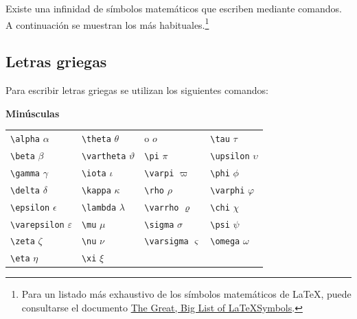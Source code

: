 \documentclass[
  a4paper,
]{scrreport}
\theoremstyle{definition}
\theoremstyle{remark}
\begin{document}
Existe una infinidad de símbolos matemáticos que escriben mediante
comandos. A continuación se muestran los más habituales.\footnote{Para
  un listado más exhaustivo de los símbolos matemáticos de \LaTeX, puede
  consultarse el documento
  \href{https://www3.nd.edu/~nmark/UsefulFacts/LaTeX_symbols.pdf}{The
  Great, Big List of \LaTeX Symbols}.}

\subsection{Letras griegas}\label{letras-griegas}

Para escribir letras griegas se utilizan los siguientes comandos:

\textbf{Minúsculas}

\begin{longtable}[]{@{}
  >{\raggedright\arraybackslash}p{}
  >{\raggedright\arraybackslash}p{}
  >{\raggedright\arraybackslash}p{}
  >{\raggedright\arraybackslash}p{}@{}}
\toprule\noalign{}
\endhead
\bottomrule\noalign{}
\endlastfoot
\texttt{\textbackslash{}alpha} \(\alpha\) &
\texttt{\textbackslash{}theta} \(\theta\) & o \(o\) &
\texttt{\textbackslash{}tau} \(\tau\) \\
\texttt{\textbackslash{}beta} \(\beta\) &
\texttt{\textbackslash{}vartheta} \(\vartheta\) &
\texttt{\textbackslash{}pi} \(\pi\) & \texttt{\textbackslash{}upsilon}
\(\upsilon\) \\
\texttt{\textbackslash{}gamma} \(\gamma\) &
\texttt{\textbackslash{}iota} \(\iota\) & \texttt{\textbackslash{}varpi}
\(\varpi\) & \texttt{\textbackslash{}phi} \(\phi\) \\
\texttt{\textbackslash{}delta} \(\delta\) &
\texttt{\textbackslash{}kappa} \(\kappa\) & \texttt{\textbackslash{}rho}
\(\rho\) & \texttt{\textbackslash{}varphi} \(\varphi\) \\
\texttt{\textbackslash{}epsilon} \(\epsilon\) &
\texttt{\textbackslash{}lambda} \(\lambda\) &
\texttt{\textbackslash{}varrho} \(\varrho\) &
\texttt{\textbackslash{}chi} \(\chi\) \\
\texttt{\textbackslash{}varepsilon} \(\varepsilon\) &
\texttt{\textbackslash{}mu} \(\mu\) & \texttt{\textbackslash{}sigma}
\(\sigma\) & \texttt{\textbackslash{}psi} \(\psi\) \\
\texttt{\textbackslash{}zeta} \(\zeta\) & \texttt{\textbackslash{}nu}
\(\nu\) & \texttt{\textbackslash{}varsigma} \(\varsigma\) &
\texttt{\textbackslash{}omega} \(\omega\) \\
\texttt{\textbackslash{}eta} \(\eta\) & \texttt{\textbackslash{}xi}
\(\xi\) & & \\
\end{longtable}
\end{document}
